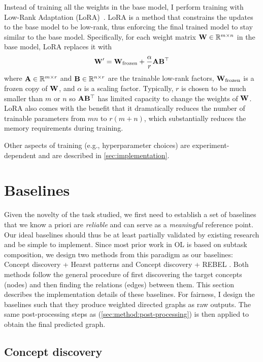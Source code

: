 Instead of training all the weights in the base model, I perform training with Low-Rank Adaptation (LoRA)~\cite{hu2021lora}. LoRA is a method that constrains the updates to the base model to be low-rank, thus enforcing the final trained model to stay similar to the base model. Specifically, for each weight matrix $\mathbf{W} \in \mathbb{R}^{m \times n}$ in the base model, LoRA replaces it with
\[
    \mathbf{W}' = \mathbf{W}_{\text{frozen}} + \frac{\alpha}{r} \mathbf{A} \mathbf{B}^\top
\]
where $\mathbf{A} \in \mathbb{R}^{m \times r}$ and $\mathbf{B} \in \mathbb{R}^{n \times r}$ are the trainable low-rank factors, $\mathbf{W}_{\text{frozen}}$ is a frozen copy of $\mathbf{W}$, and $\alpha$ is a scaling factor. Typically, $r$ is chosen to be much smaller than $m$ or $n$ so $\mathbf{A}\mathbf{B}^\top$ has limited capacity to change the weights of $\mathbf{W}$. LoRA also comes with the benefit that it dramatically reduces the number of trainable parameters from $mn$ to $r(m + n)$, which substantially reduces the memory requirements during training.

Other aspects of training (e.g., hyperparameter choices) are experiment-dependent and are described in \cref{sec:implementation}.

\section{Baselines}  \label{sec:implementation:baselines}

Given the novelty of the task studied, we first need to establish a set of baselines that we know a priori are \emph{reliable} and can serve as a \emph{meaningful} reference point. Our ideal baselines should thus be at least partially validated by existing research and be simple to implement. Since most prior work in OL is based on subtask composition, we design two methods from this paradigm as our baselines: Concept discovery + Hearst patterns \cite{hearst1998automated} and Concept discovery + REBEL \cite{cabot2021rebel}. Both methods follow the general procedure of first discovering the target concepts (nodes) and then finding the relations (edges) between them. This section describes the implementation details of these baselines. For fairness, I design the baselines such that they produce weighted directed graphs as raw outputs. The same post-processing steps as \name (\cref{sec:method:post-processing}) is then applied to obtain the final predicted graph.

\subsection{Concept discovery}

